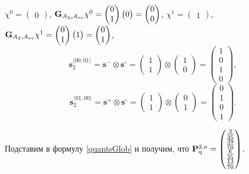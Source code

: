 $\chi^0 = \begin{pmatrix} 0 \end{pmatrix} $, 
$ \mathbf{G}_{\mathcal{A}_2, \mathcal{A}_{\mathrm{ev}}} \chi^0 = \begin{pmatrix} 0 \\ 1 \end{pmatrix} \begin{pmatrix} 0 \end{pmatrix}  = \begin{pmatrix}  0 \\ 0 \end{pmatrix}$,
$\chi^1 = \begin{pmatrix} 1 \end{pmatrix} $, 
$\mathbf{G}_{\mathcal{A}_2, \mathcal{A}_{\mathrm{ev}}} \chi^1  = \begin{pmatrix} 0 \\ 1 \end{pmatrix} \begin{pmatrix} 1 \end{pmatrix}  = \begin{pmatrix}  0 \\ 1 \end{pmatrix}$,
\begin{equation*}
\mathbf{s}_2^{\langle 00, 01 \rangle} = \mathbf{s}^- \otimes \mathbf{s}^\circ = \begin{pmatrix} 1 \\ 1 \end{pmatrix} \otimes \begin{pmatrix}  1 \\ 0 \end{pmatrix} = \begin{pmatrix}  1 \\ 0 \\ 1 \\ 0 \end{pmatrix},
\end{equation*}
\begin{equation*}
\mathbf{s}_2^{\langle 01, 00 \rangle} = \mathbf{s}^+ \otimes \mathbf{s}^\circ =
\begin{pmatrix} 1 \\ 1 \end{pmatrix} \otimes \begin{pmatrix}  0 \\ 1 \end{pmatrix} = \begin{pmatrix}  0 \\ 1 \\ 0 \\ 1 \end{pmatrix}.
\end{equation*}


Подставим в формулу \ref{quantsGlob} и получим, что $\mathbf{P}_\mathrm{q}^{ 2,a} = \begin{pmatrix}
\frac{3}{35}  \\ \frac{39}{70} \\ \frac{6}{35} \\ \frac{13}{70}
\end{pmatrix}$.
